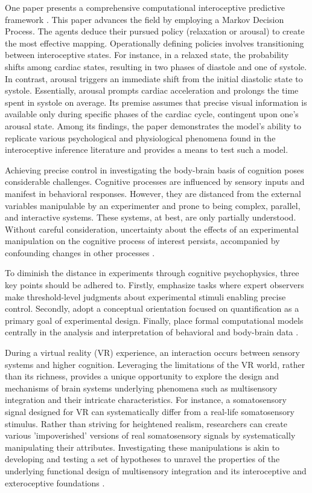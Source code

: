 \documentclass[12pt,oneside,openright]{report}
\begin{document}
One paper presents a comprehensive computational interoceptive predictive framework \parencite{Allen2022}. This paper advances the field by employing a Markov Decision Process. The agents deduce their pursued policy (relaxation or arousal) to create the most effective mapping. Operationally defining policies involves transitioning between interoceptive states. For instance, in a relaxed state, the probability shifts among cardiac states, resulting in two phases of diastole and one of systole. In contrast, arousal triggers an immediate shift from the initial diastolic state to systole. Essentially, arousal prompts cardiac acceleration and prolongs the time spent in systole on average. Its premise assumes that precise visual information is available only during specific phases of the cardiac cycle, contingent upon one's arousal state. Among its findings, the paper demonstrates the model's ability to replicate various psychological and physiological phenomena found in the interoceptive inference literature and provides a means to test such a model.

Achieving precise control in investigating the body-brain basis of cognition poses considerable challenges. Cognitive processes are influenced by sensory inputs and manifest in behavioral responses. However, they are distanced from the external variables manipulable by an experimenter and prone to being complex, parallel, and interactive systems. These systems, at best, are only partially understood. Without careful consideration, uncertainty about the effects of an experimental manipulation on the cognitive process of interest persists, accompanied by confounding changes in other processes \parencite{WASKOM2019100}.

To diminish the distance in experiments through cognitive psychophysics, three key points should be adhered to. Firstly, emphasize tasks where expert observers make threshold-level judgments about experimental stimuli enabling precise control. Secondly, adopt a conceptual orientation focused on quantification as a primary goal of experimental design. Finally, place formal computational models centrally in the analysis and interpretation of behavioral and body-brain data \parencite{WASKOM2019100}.

During a virtual reality (VR) experience, an interaction occurs between sensory systems and higher cognition. Leveraging the limitations of the VR world, rather than its richness, provides a unique opportunity to explore the design and mechanisms of brain systems underlying phenomena such as multisensory integration and their intricate characteristics. For instance, a somatosensory signal designed for VR can systematically differ from a real-life somatosensory stimulus. Rather than striving for heightened realism, researchers can create various 'impoverished' versions of real somatosensory signals by systematically manipulating their attributes. Investigating these manipulations is akin to developing and testing a set of hypotheses to unravel the properties of the underlying functional design of multisensory integration and its interoceptive and exteroceptive foundations \parencite{deGelder2018VirtualRA}.
\end{document}
